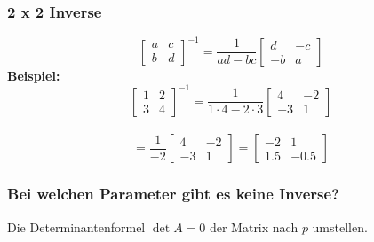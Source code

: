 \documentclass[12pt,a4paper]{article}
\begin{document}
\subsubsection{2 x 2 Inverse}
\[
\begin{bmatrix}
    a & c \\
    b & d
\end{bmatrix}^{-1}
=
\frac{1}{ad - bc}
\begin{bmatrix}
    d & -c \\
    -b & a
\end{bmatrix}
\]
\textbf{Beispiel:}
\[
\begin{bmatrix}
    1 & 2 \\
    3 & 4
\end{bmatrix}^{-1}
=
\frac{1}{1 \cdot 4 - 2 \cdot 3}
\begin{bmatrix}
    4 & -2 \\
    -3 & 1
\end{bmatrix}
\]
\\
\[
=
\frac{1}{-2}
\begin{bmatrix}
    4 & -2 \\
    -3 & 1
\end{bmatrix}
=
\begin{bmatrix}
    -2 & 1 \\
    1.5 & -0.5
\end{bmatrix}
\]

\subsubsection{Bei welchen Parameter gibt es keine Inverse?}
Die Determinantenformel $\det A = 0$ der Matrix nach $p$ umstellen. 
\end{document}
